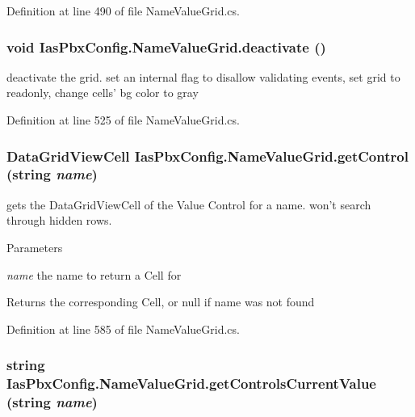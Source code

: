 Definition at line 490 of file NameValueGrid.cs.\hypertarget{class_ias_pbx_config_1_1_name_value_grid_a6754dd22f44f6aad8ef8b104e92d2538}{
\subsubsection[{deactivate}]{\setlength{\rightskip}{0pt plus 5cm}void IasPbxConfig.NameValueGrid.deactivate ()}}
\label{class_ias_pbx_config_1_1_name_value_grid_a6754dd22f44f6aad8ef8b104e92d2538}


deactivate the grid. set an internal flag to disallow validating events, set grid to readonly, change cells' bg color to gray 

Definition at line 525 of file NameValueGrid.cs.\hypertarget{class_ias_pbx_config_1_1_name_value_grid_a9aa3b69e7ca463cb1cb900e25c904712}{
\subsubsection[{getControl}]{\setlength{\rightskip}{0pt plus 5cm}DataGridViewCell IasPbxConfig.NameValueGrid.getControl (string {\em name})}}
\label{class_ias_pbx_config_1_1_name_value_grid_a9aa3b69e7ca463cb1cb900e25c904712}


gets the DataGridViewCell of the Value Control for a name. won't search through hidden rows. 
\begin{DoxyParams}{Parameters}
\item[{\em name}]the name to return a Cell for \end{DoxyParams}
\begin{DoxyReturn}{Returns}
the corresponding Cell, or null if name was not found 
\end{DoxyReturn}


Definition at line 585 of file NameValueGrid.cs.\hypertarget{class_ias_pbx_config_1_1_name_value_grid_ade71f1670c36b0b421cd4b0812f6aa5f}{
\subsubsection[{getControlsCurrentValue}]{\setlength{\rightskip}{0pt plus 5cm}string IasPbxConfig.NameValueGrid.getControlsCurrentValue (string {\em name})}}
\label{class_ias_pbx_config_1_1_name_value_grid_ade71f1670c36b0b421cd4b0812f6aa5f}



